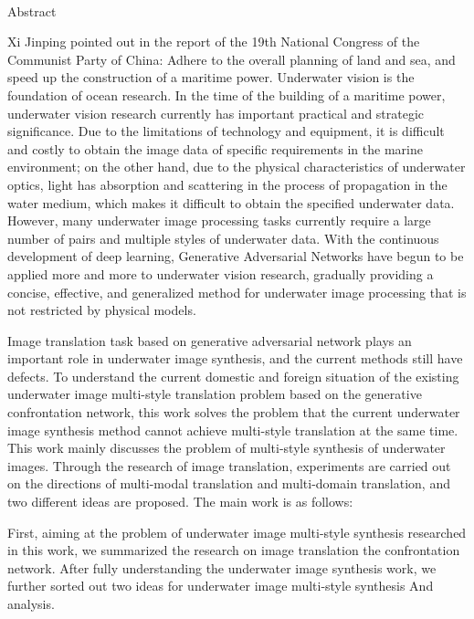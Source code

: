 \newpage

\begin{center}
  {\sanhao[1.5]\heiti\oucetitle\\\vskip7pt Abstract}
\end{center}
{\normalsize\songti

Xi Jinping pointed out in the report of the 19th National Congress of the Communist Party of China: Adhere to the overall planning of land and sea, and speed up the construction of a maritime power. Underwater vision is the foundation of ocean research. In the time of the building of a maritime power, underwater vision research currently has important practical and strategic significance. Due to the limitations of technology and equipment, it is difficult and costly to obtain the image data of specific requirements in the marine environment; on the other hand, due to the physical characteristics of underwater optics, light has absorption and scattering in the process of propagation in the water medium, which makes it difficult to obtain the specified underwater data. However, many underwater image processing tasks currently require a large number of pairs and multiple styles of underwater data. With the continuous development of deep learning, Generative Adversarial Networks have begun to be applied more and more to underwater vision research, gradually providing a concise, effective, and generalized method for underwater image processing that is not restricted by physical models.

Image translation task based on generative adversarial network plays an important role in underwater image synthesis, and the current methods still have defects. To understand the current domestic and foreign situation of the existing underwater image multi-style translation problem based on the generative confrontation network, this work solves the problem that the current underwater image synthesis method cannot achieve multi-style translation at the same time. This work mainly discusses the problem of multi-style synthesis of underwater images. Through the research of image translation, experiments are carried out on the directions of multi-modal translation and multi-domain translation, and two different ideas are proposed. The main work is as follows:

First, aiming at the problem of underwater image multi-style synthesis researched in this work, we summarized the research on image translation the confrontation network. After fully understanding the underwater image synthesis work, we further sorted out two ideas for underwater image multi-style synthesis And analysis.

}
